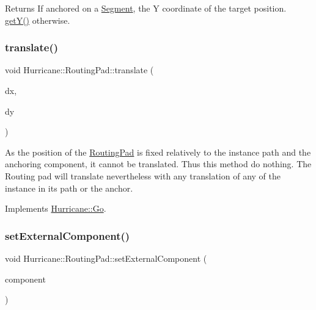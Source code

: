 \begin{DoxyReturn}{Returns}
If anchored on a \hyperlink{classHurricane_1_1Segment}{Segment}, the Y coordinate of the target position. \hyperlink{classHurricane_1_1RoutingPad_aede4c04a7f893b1e5478b164b6eaae2d}{get\+Y()} otherwise. 
\end{DoxyReturn}
\mbox{\label{classHurricane_1_1RoutingPad_a41bf66ffda0c0ceaaebc67acd72d5b36}} 
\subsubsection{\texorpdfstring{translate()}{translate()}}
{\footnotesize\ttfamily void Hurricane\+::\+Routing\+Pad\+::translate (\begin{DoxyParamCaption}\item[{const \hyperlink{group__DbUGroup_ga4fbfa3e8c89347af76c9628ea06c4146}{Db\+U\+::\+Unit} \&}]{dx,  }\item[{const \hyperlink{group__DbUGroup_ga4fbfa3e8c89347af76c9628ea06c4146}{Db\+U\+::\+Unit} \&}]{dy }\end{DoxyParamCaption})\hspace{0.3cm}{\ttfamily [virtual]}}

As the position of the \hyperlink{classHurricane_1_1RoutingPad}{Routing\+Pad} is fixed relatively to the instance path and the anchoring component, it cannot be translated. Thus this method do nothing. The Routing pad will translate nevertheless with any translation of any of the instance in it\textquotesingle{}s path or the anchor. 

Implements \hyperlink{classHurricane_1_1Go_a54c4351dbbf4045e1aa89f06bb893402}{Hurricane\+::\+Go}.

\mbox{\label{classHurricane_1_1RoutingPad_a9f448ad4f05f6995edc4a5ab50501586}} 
\subsubsection{\texorpdfstring{set\+External\+Component()}{setExternalComponent()}}
{\footnotesize\ttfamily void Hurricane\+::\+Routing\+Pad\+::set\+External\+Component (\begin{DoxyParamCaption}\item[{\hyperlink{classHurricane_1_1Component}{Component} $\ast$}]{component }\end{DoxyParamCaption})}

